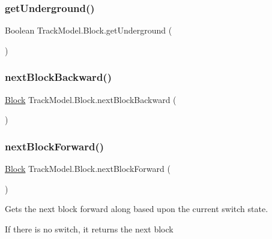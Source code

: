 \subsubsection{\texorpdfstring{get\+Underground()}{getUnderground()}}
{\footnotesize\ttfamily Boolean Track\+Model.\+Block.\+get\+Underground (\begin{DoxyParamCaption}{ }\end{DoxyParamCaption})}

\mbox{\label{classTrackModel_1_1Block_a0ea37da4be949e0734cd7c6db555013e}} 
\subsubsection{\texorpdfstring{next\+Block\+Backward()}{nextBlockBackward()}}
{\footnotesize\ttfamily \hyperlink{classTrackModel_1_1Block}{Block} Track\+Model.\+Block.\+next\+Block\+Backward (\begin{DoxyParamCaption}{ }\end{DoxyParamCaption})}

\mbox{\label{classTrackModel_1_1Block_a5b41d49bee482917bbc5d3af78c25020}} 
\subsubsection{\texorpdfstring{next\+Block\+Forward()}{nextBlockForward()}}
{\footnotesize\ttfamily \hyperlink{classTrackModel_1_1Block}{Block} Track\+Model.\+Block.\+next\+Block\+Forward (\begin{DoxyParamCaption}{ }\end{DoxyParamCaption})}



Gets the next block forward along based upon the current switch state. 

If there is no switch, it returns the next block \mbox{\label{classTrackModel_1_1Block_ade3dc0b39ce6d111e7491443b052051e}} 
